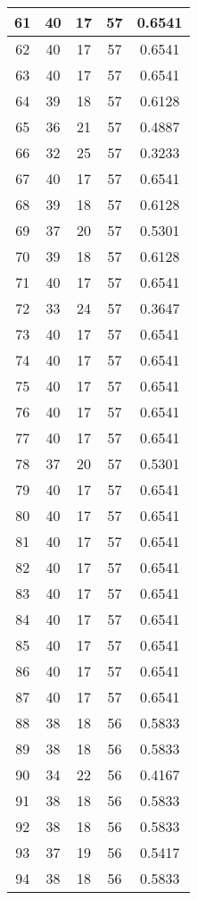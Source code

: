 \documentclass[letterpaper, 12pt]{article}
\begin{document}
\begin{longtable}{|c|c|c|c|c|}
\hline
61 & 40 & 17 & 57 & 0.6541 \\
\hline
62 & 40 & 17 & 57 & 0.6541 \\
\hline
63 & 40 & 17 & 57 & 0.6541 \\
\hline
64 & 39 & 18 & 57 & 0.6128 \\
\hline
65 & 36 & 21 & 57 & 0.4887 \\
\hline
66 & 32 & 25 & 57 & 0.3233 \\
\hline
67 & 40 & 17 & 57 & 0.6541 \\
\hline
68 & 39 & 18 & 57 & 0.6128 \\
\hline
69 & 37 & 20 & 57 & 0.5301 \\
\hline
70 & 39 & 18 & 57 & 0.6128 \\
\hline
71 & 40 & 17 & 57 & 0.6541 \\
\hline
72 & 33 & 24 & 57 & 0.3647 \\
\hline
73 & 40 & 17 & 57 & 0.6541 \\
\hline
74 & 40 & 17 & 57 & 0.6541 \\
\hline
75 & 40 & 17 & 57 & 0.6541 \\
\hline
76 & 40 & 17 & 57 & 0.6541 \\
\hline
77 & 40 & 17 & 57 & 0.6541 \\
\hline
78 & 37 & 20 & 57 & 0.5301 \\
\hline
79 & 40 & 17 & 57 & 0.6541 \\
\hline
80 & 40 & 17 & 57 & 0.6541 \\
\hline
81 & 40 & 17 & 57 & 0.6541 \\
\hline
82 & 40 & 17 & 57 & 0.6541 \\
\hline
83 & 40 & 17 & 57 & 0.6541 \\
\hline
84 & 40 & 17 & 57 & 0.6541 \\
\hline
85 & 40 & 17 & 57 & 0.6541 \\
\hline
86 & 40 & 17 & 57 & 0.6541 \\
\hline
87 & 40 & 17 & 57 & 0.6541 \\
\hline
88 & 38 & 18 & 56 & 0.5833 \\
\hline
89 & 38 & 18 & 56 & 0.5833 \\
\hline
90 & 34 & 22 & 56 & 0.4167 \\
\hline
91 & 38 & 18 & 56 & 0.5833 \\
\hline
92 & 38 & 18 & 56 & 0.5833 \\
\hline
93 & 37 & 19 & 56 & 0.5417 \\
\hline
94 & 38 & 18 & 56 & 0.5833 \\

\end{longtable}
\end{document}
